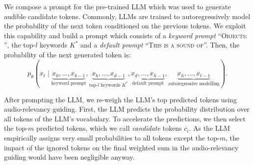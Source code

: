 \documentclass{article}
\newcommand{\mypara}[1]{\vspace{2pt}\noindent{\bf{#1}}}
\begin{document}
We compose a prompt for the pre-trained LLM which was used to generate audible candidate tokens.
Commonly, LLMs are trained to autoregressively model the probability of the next token conditioned on the previous tokens.
We exploit this capability and build a prompt which
consists of a \emph{keyword prompt} \enquote{\textsc{Objects: }}, the top-$l$ keywords $K^*$ and a \emph{default prompt} \enquote{\textsc{This is a sound of}}.
Then, the probability of the next generated token is:
\begin{equation}\label{eq:lm-prediction}
    p_{\theta}(x_t \mid
    \underbrace{x_0, \ldots, x_{b-1}}_{\text{keyword prompt}},
    \underbrace{x_{b}, \ldots, x_{d-1}}_{\text{top-$l$ keywords $K^*$}},
    \underbrace{x_{d}, \ldots, x_{h-1}}_{\text{default prompt}},
    \underbrace{x_{h}, \ldots, x_{t-1}}_{\text{autoregressive modelling}}).
\end{equation}


\mypara{Audio-relevancy guiding.}
After prompting the LLM, we re-weigh the LLM's top predicted tokens using audio-relevancy guiding. First, the LLM predicts the probability distribution over all tokens of the LLM's vocabulary. To accelerate the predictions, we then select the top-$m$ predicted tokens, which we call \emph{candidate} tokens $c_i$. As the LLM empirically assigns very small probabilities to all tokens except the top-$m$, the impact of the ignored tokens on the final weighted sum in the audio-relevancy guiding would have been negligible anyway.
\end{document}
